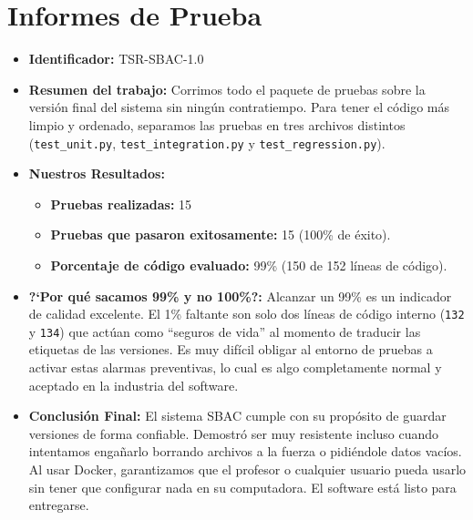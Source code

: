 \documentclass[12pt, letterpaper]{article}
\begin{document}
\section{Informes de Prueba}
\begin{itemize}[leftmargin=*]
    \item \textbf{Identificador:} TSR-SBAC-1.0
    \item \textbf{Resumen del trabajo:} Corrimos todo el paquete de pruebas sobre la versión final del sistema sin ningún contratiempo. Para tener el código más limpio y ordenado, separamos las pruebas en tres archivos distintos (\texttt{test\_unit.py}, \texttt{test\_integration.py} y \texttt{test\_regression.py}).
    \item \textbf{Nuestros Resultados:}
    \begin{itemize}
        \item \textbf{Pruebas realizadas:} 15
        \item \textbf{Pruebas que pasaron exitosamente:} 15 (100\% de éxito).
        \item \textbf{Porcentaje de código evaluado:} 99\% (150 de 152 líneas de código).
    \end{itemize}
    \item \textbf{?`Por qué sacamos 99\% y no 100\%?:} Alcanzar un 99\% es un indicador de calidad excelente. El 1\% faltante son solo dos líneas de código interno (\texttt{132} y \texttt{134}) que actúan como ``seguros de vida'' al momento de traducir las etiquetas de las versiones. Es muy difícil obligar al entorno de pruebas a activar estas alarmas preventivas, lo cual es algo completamente normal y aceptado en la industria del software.
    \item \textbf{Conclusión Final:} El sistema SBAC cumple con su propósito de guardar versiones de forma confiable. Demostró ser muy resistente incluso cuando intentamos engañarlo borrando archivos a la fuerza o pidiéndole datos vacíos. Al usar Docker, garantizamos que el profesor o cualquier usuario pueda usarlo sin tener que configurar nada en su computadora. El software está listo para entregarse.
\end{itemize}
\end{document}
